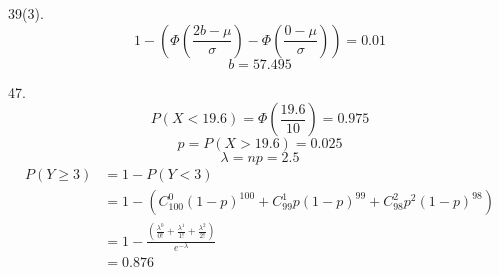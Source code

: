 \documentclass[10pt, a4paper,twocolumn]{article}
\begin{document}
    39(3). 
    $$1 - (\Phi(\frac{2b - \mu}{\sigma}) - \Phi(\frac{0 - \mu}{\sigma})) = 0.01$$
    $$b = 57.495$$

    47.
    $$P(X < 19.6) = \Phi(\frac{19.6}{10}) = 0.975$$
    $$p = P(X > 19.6) = 0.025$$
    $$\lambda = np = 2.5$$
    $$\begin{aligned}
        P(Y \geqslant 3) 
        &= 1 - P(Y < 3) \\
        &= 1 - (C_{100}^0(1 - p)^{100} + C_{99}^1p(1 - p)^{99} + C_{98}^2p^2(1 - p)^{98})\\
        &= 1 - \frac{(\frac{\lambda^0}{0!} + \frac{\lambda^1}{1!} + \frac{\lambda^2}{2!})}{e^{-\lambda}} \\
        &= 0.876
    \end{aligned}$$
\end{document}
